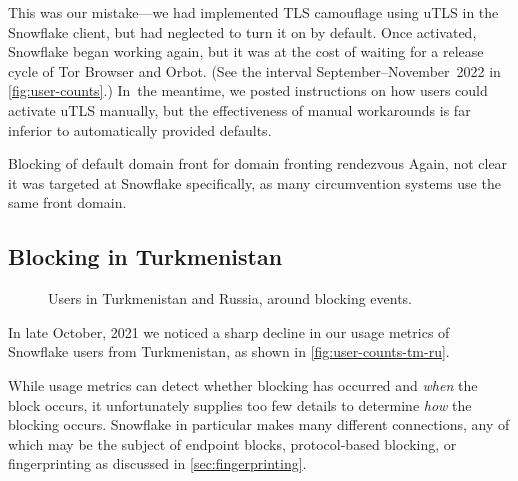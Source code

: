 \documentclass[letterpaper,twocolumn]{article}
\begin{document}
This was our mistake---we had implemented TLS camouflage using uTLS
in the Snowflake client, but had neglected to turn it on by default.
Once activated, Snowflake began working again,
but it was at the cost of waiting for a release cycle of Tor Browser and Orbot.
(See the interval September--November~2022 in \autoref{fig:user-counts}.)
In~the meantime, we posted instructions on how users could activate uTLS manually,
but the effectiveness of manual workarounds is far inferior to automatically provided defaults.

Blocking of default domain front for domain fronting rendezvous
Again, not clear it was targeted at Snowflake specifically,
as many circumvention systems use the same front domain.

\subsection{Blocking in Turkmenistan}
\label{sec:block-tm}

\begin{figure}
\caption{
Users in Turkmenistan and Russia,
around blocking events.
}
\label{fig:user-counts-tm-ru}
\end{figure}



In late October, 2021 we noticed a sharp decline in our usage metrics of Snowflake users from 
Turkmenistan, as shown in \autoref{fig:user-counts-tm-ru}.

While usage metrics can detect whether blocking has occurred and \emph{when} the block occurs, 
it unfortunately supplies too few details to determine \emph{how} the blocking occurs. 
Snowflake in particular makes many different connections, any of which may be the subject of endpoint blocks, 
protocol-based blocking, or fingerprinting as discussed in \autoref{sec:fingerprinting}.
\end{document}
